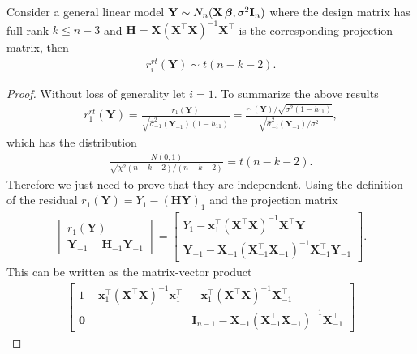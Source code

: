 \begin{proposition}
    Consider a general linear model $\textbf{Y} \sim N_n(\textbf{X} \operatorname{\boldsymbol{\beta}}, \sigma^2 \textbf{I}_n)$ where the design matrix has full rank $k \leq n-3$ and $\textbf{H} = \textbf{X} (\textbf{X}^\top \textbf{X})^{-1}\textbf{X}^\top$ is the corresponding projection-matrix, then
    \begin{align*}
        r_i^{rt}(\textbf{Y}) \sim t(n-k-2).
    \end{align*}
\end{proposition}
\begin{proof}
    Without loss of generality let $i=1$. 
    To summarize the above results
    \begin{align*}
        r_1^{rt}(\textbf{Y}) = \frac{r_1(\textbf{Y})}{\sqrt{\hat{\sigma}^2_{-1}(\textbf{Y}_{-1})(1-h_{11})}}
        =
        \frac{r_1(\textbf{Y})/ \sqrt{\sigma^2 (1-h_{11})}}{\sqrt{\hat{\sigma}_{-i}^2 (\textbf{Y}_{-1})/\sigma^2}},
    \end{align*}
    which has the distribution
    \begin{align*}
        \frac{N(0,1)}{\sqrt{\chi^2(n-k-2)/(n-k-2)}} = t(n-k-2).
    \end{align*}
    Therefore we just need to prove that they are independent.
    Using the definition of the residual $r_1(\textbf{Y}) = Y_1 -  (\textbf{HY})_1$ and the projection matrix
    \begin{align*}
        \begin{bmatrix}
            r_1(\textbf{Y}) \\
            \textbf{Y}_{-1} - \textbf{H}_{-1} \textbf{Y}_{-1}
        \end{bmatrix}
        =
        \begin{bmatrix}
            Y_1 - \textbf{x}_1^\top (\textbf{X}^\top \textbf{X})^{-1} \textbf{X}^\top \textbf{Y} \\
            \textbf{Y}_{-1} - \textbf{X}_{-1} (\textbf{X}_{-1}^\top \textbf{X}_{-1})^{-1} \textbf{X}_{-1}^\top \textbf{Y}_{-1}
        \end{bmatrix}.
    \end{align*}
    This can be written as the matrix-vector product
    \begin{align*}
        \begin{bmatrix}
            1 - \textbf{x}_1^\top (\textbf{X}^\top \textbf{X})^{-1} \textbf{x}_1^\top & - \textbf{x}_1^\top (\textbf{X}^\top \textbf{X})^{-1} \textbf{X}_{-1}^\top \\
            \textbf{0} & \textbf{I}_{n-1} - \textbf{X}_{-1} (\textbf{X}_{-1}^\top \textbf{X}_{-1})^{-1} \textbf{X}_{-1}^\top

\end{bmatrix}
\end{align*}
\end{proof}
